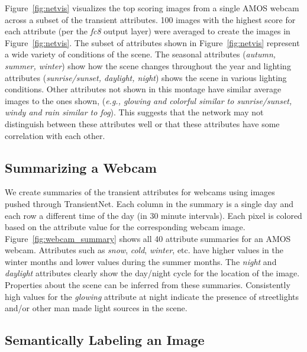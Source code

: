 \documentclass[10pt,twocolumn,letterpaper]{article}
\newcommand{\figref}[1]{Figure~\ref{fig:#1}}
\begin{document}
\figref{netvis} visualizes the top scoring images from a single
AMOS webcam across a subset of the transient attributes.
100 images with the highest score for each attribute (per the \textit{fc8}
output layer) were averaged to create the images in \figref{netvis}.  The
subset of attributes shown in \figref{netvis} represent a wide variety of
conditions of the scene.  The seasonal attributes (\textit{autumn, summer,
winter}) show how the scene changes throughout the year and lighting attributes
(\textit{sunrise/sunset, daylight, night}) shows the scene in various lighting
conditions.  Other attributes not shown in this montage have similar average
images to the ones shown, (\textit{e.g., glowing and colorful similar to
sunrise/sunset, windy and rain similar to fog}).  This suggests that the
network may not distinguish between these attributes well or that these
attributes have some correlation with each other.

\subsection{Summarizing a Webcam}
We create summaries of the transient attributes for webcams using images pushed
through TransientNet.  Each column in the summary is a single day and each row
a different time of the day (in 30 minute intervals).  Each pixel is colored
based on the attribute value for the corresponding webcam image.
\figref{webcam_summary} shows all 40 attribute summaries for an AMOS webcam.
Attributes such as \textit{snow}, \textit{cold}, \textit{winter}, etc. have
higher values in the winter months and lower values during the summer months.
The \textit{night} and \textit{daylight} attributes clearly show the day/night
cycle for the location of the image.  Properties about the scene can be
inferred from these summaries.  Consistently high values for the
\textit{glowing} attribute at night indicate the presence of streetlights
and/or other man made light sources in the scene.

\subsection{Semantically Labeling an Image}
\end{document}
